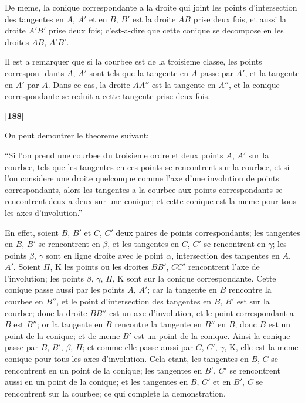 \documentclass[11pt,a4paper]{article}
\begin{document}
De meme, la conique correspondante a la droite qui joint les points d'intersection
des tangentes en $A$, $A'$ et en $B$, $B'$ est la droite $AB$ prise deux fois, et aussi la droite
$A'B'$ prise deux fois; c'est-a-dire que cette conique se decompose en les droites $AB$,
$A'B'$.

Il est a remarquer que si la courbee est de la troisieme classe, les points correspon-
dants $A$, $A'$ sont tels que la tangente en $A$ passe par $A'$, et la tangente en $A'$ par $A$.
Dans ce cas, la droite $AA''$ est la tangente en $A''$, et la conique correspondante se
reduit a cette tangente prise deux fois.

\textbf{[188]}

On peut demontrer le theoreme suivant:

``Si l'on prend une courbee du troisieme ordre et deux points $A$, $A'$ sur la courbee,
tels que les tangentes en ces points se rencontrent sur la courbee, et si l'on considere
une droite quelconque comme l'axe d'une involution de points correspondants, alors
les tangentes a la courbee aux points correspondants se rencontrent deux a deux sur une
conique; et cette conique est la meme pour tous les axes d'involution.''

En effet, soient $B$, $B'$ et $C$, $C'$ deux paires de points correspondants; les tangentes
en $B$, $B'$ se rencontrent en $\beta$, et les tangentes en $C$, $C'$ se rencontrent en $\gamma$; les points
$\beta$, $\gamma$ sont en ligne droite avec le point $\alpha$, intersection des tangentes en $A$, $A'$. Soient
$\Pi$, $\mathrm{K}$ les points ou les droites $BB'$, $CC'$ rencontrent l'axe de l'involution; les points
$\beta$, $\gamma$, $\Pi$, $\mathrm{K}$ sont sur la conique correspondante. Cette conique passe aussi par les
points $A$, $A'$; car la tangente en $B$ rencontre la courbee en $B''$, et le point d'intersection
des tangentes en $B$, $B'$ est sur la courbee; donc la droite $BB''$ est un axe d'involution,
et le point correspondant a $B$ est $B''$; or la tangente en $B$ rencontre la tangente en $B''$
en $B$; donc $B$ est un point de la conique; et de meme $B'$ est un point de la conique.
Ainsi la conique passe par $B$, $B'$, $\beta$, $\Pi$; et comme elle passe aussi par $C$, $C'$, $\gamma$, $\mathrm{K}$,
elle est la meme conique pour tous les axes d'involution. Cela etant, les tangentes en
$B$, $C$ se rencontrent en un point de la conique; les tangentes en $B'$, $C'$ se rencontrent
aussi en un point de la conique; et les tangentes en $B$, $C'$ et en $B'$, $C$ se rencontrent
sur la courbee; ce qui complete la demonstration.
\end{document}
